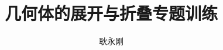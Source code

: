 \documentclass[draft]{tiku}
\title{几何体的展开与折叠专题训练}
\author{耿永刚}
\begin{document}
\begin{enumerate}
\foreachproblem{%
\item%
\label{prob:\thisproblemlabel}
\thisproblem%
}
\end{enumerate}
\end{document}
